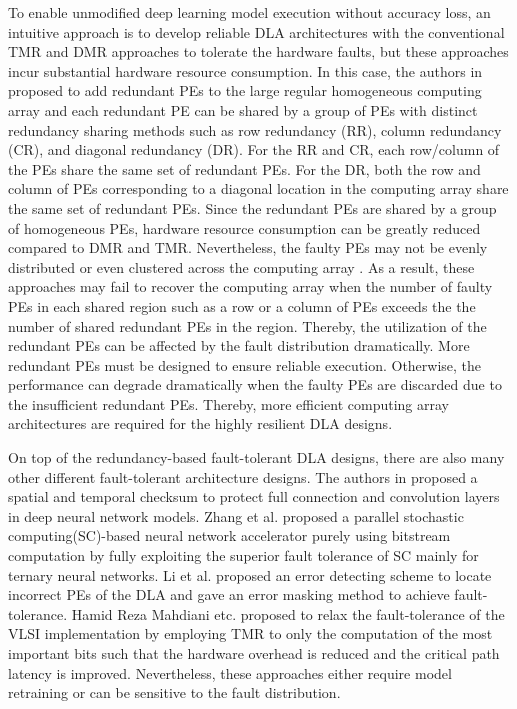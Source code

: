 To enable unmodified deep learning model execution without accuracy loss, an intuitive approach is to develop reliable DLA architectures with the conventional TMR and DMR approaches to tolerate the hardware faults, but these approaches incur substantial hardware resource consumption. In this case, the authors in \cite{takanami2017built}\cite{takanami2012built}\cite{horita2000fault} proposed to add redundant PEs to the large regular homogeneous computing array and each redundant PE can be shared by a group of PEs with distinct redundancy sharing methods such as row redundancy (RR), column redundancy (CR), and diagonal redundancy (DR). For the RR and CR, each row/column of the PEs share the same set of redundant PEs. For the DR, both the row and column of PEs corresponding to a diagonal location in the computing array share the same set of redundant PEs. Since the redundant PEs are shared by a group of homogeneous PEs, hardware resource consumption can be greatly reduced compared to DMR and TMR. Nevertheless, the faulty PEs may not be evenly distributed or even clustered across the computing array \cite{stapper1983integrated}. As a result, these approaches may fail to recover the computing array when the number of faulty PEs in each shared region such as a row or a column of PEs exceeds the the number of shared redundant PEs in the region. Thereby, the utilization of the redundant PEs can be affected by the fault distribution dramatically. More redundant PEs must be designed to ensure reliable execution. Otherwise, the performance can degrade dramatically when the faulty PEs are discarded due to the insufficient redundant PEs. Thereby, more efficient computing array architectures are required for the highly resilient DLA designs. 

On top of the redundancy-based fault-tolerant DLA designs, there are also many other different fault-tolerant architecture designs. The authors in \cite{ozen2019sanity} \cite{zhao2020algorithm} proposed a spatial and temporal checksum to protect full connection and convolution layers in deep neural network models. Zhang et al. \cite{zhang2020sorting} proposed a parallel stochastic computing(SC)-based neural network accelerator purely using bitstream computation by fully exploiting the superior fault tolerance of SC mainly for ternary neural networks. Li et al. \cite{li2020soft} proposed an error detecting scheme to locate incorrect PEs of the DLA and gave an error masking method to achieve fault-tolerance. Hamid Reza Mahdiani etc. \cite{mahdiani2012relaxed} proposed to relax the fault-tolerance of the VLSI implementation by employing TMR to only the computation of the most important bits such that the hardware overhead is reduced and the critical path latency is improved. Nevertheless, these approaches either require model retraining or can be sensitive to the fault distribution.


